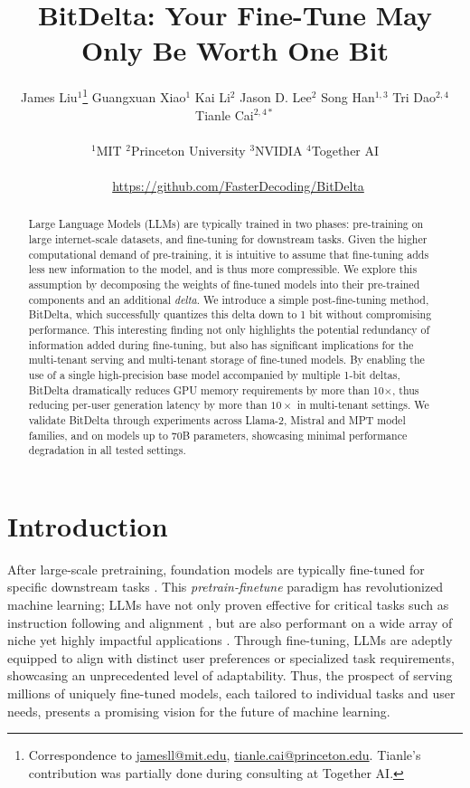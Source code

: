 \documentclass[numbers]{article}
\title{BitDelta: Your Fine-Tune May Only Be Worth One Bit}
\author{
\hspace{-0.45cm}
James Liu$^{1}$\thanks{Correspondence to \href{mailto:jamesll@mit.edu}{\url{jamesll@mit.edu}}, \href{mailto:tianle.cai@princeton.edu}{\url{tianle.cai@princeton.edu}}. Tianle’s contribution was partially
done during consulting at Together AI.} 
\space\space%
Guangxuan Xiao$^{1}$
\space
Kai Li$^2$
\space
Jason D. Lee$^2$
\space
Song Han$^{1,3}$
\space
Tri Dao$^{2,4}$
\space
Tianle Cai$^{2,4*}$ \\ \\
$^1$MIT \quad $^2$Princeton University \quad $^3$NVIDIA \quad $^4$Together AI  \\ \\
\faGithub \,\,\,\url{https://github.com/FasterDecoding/BitDelta}
}
\newcommand{\oursmethod}{BitDelta\xspace}
\begin{document}
\maketitle


\begin{abstract}
Large Language Models (LLMs) are typically trained in two phases: pre-training on large internet-scale datasets, and fine-tuning for downstream tasks. Given the higher computational demand of pre-training, it is intuitive to assume that fine-tuning adds less new information to the model, and is thus more compressible. We explore this assumption by decomposing the weights of fine-tuned models into their pre-trained components and an additional \emph{delta}. We introduce a simple post-fine-tuning method, \oursmethod, which successfully quantizes this delta down to 1 bit without compromising performance. This interesting finding not only highlights the potential redundancy of information added during fine-tuning, but also has significant implications for the multi-tenant serving and multi-tenant storage of fine-tuned models. By enabling the use of a single high-precision base model accompanied by multiple 1-bit deltas, \oursmethod dramatically reduces GPU memory requirements by more than 10$\times$, thus reducing per-user generation latency by more than $10\times$ in multi-tenant settings. We validate \oursmethod through experiments across Llama-2, Mistral and MPT model families, and on models up to 70B parameters, showcasing minimal performance degradation in all tested settings. 
\end{abstract}


\section{Introduction}
\label{sec:intro}
After large-scale pretraining, foundation models are typically fine-tuned for specific downstream tasks \citep{devlin2019bert,radford2018improving,radford2019language}. This \textit{pretrain-finetune} paradigm has revolutionized machine learning; LLMs have not only proven effective for critical tasks such as instruction following and alignment \cite{ouyang2022training}, but are also performant on a wide array of niche yet highly impactful applications \cite{edgecloud,healthinfo}. Through fine-tuning, LLMs are adeptly equipped to align with distinct user preferences or specialized task requirements, showcasing an unprecedented level of adaptability. Thus, the prospect of serving millions of uniquely fine-tuned models, each tailored to individual tasks and user needs, presents a promising vision for the future of machine learning.
\end{document}
